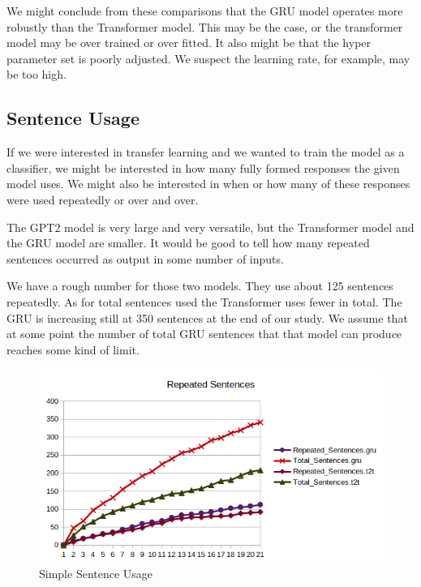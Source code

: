 We might conclude from these comparisons that the GRU model operates more robustly than the Transformer model. This may be the case, or the transformer model may be over trained or over fitted. It also might be that the hyper parameter set is poorly adjusted. We suspect the learning rate, for example, may be too high.

\subsection{Sentence Usage}

If we were interested in transfer learning and we wanted to train the model as a classifier, we might be interested in how many fully formed responses the given model uses. We might also be interested in when or how many of these responses were used repeatedly or over and over.

The GPT2 model is very large and very versatile, but the Transformer model and the GRU model are smaller. It would be good to tell how many repeated sentences occurred as output in some number of inputs.

We have a rough number for those two models. They use about 125 sentences repeatedly. As for total sentences used the Transformer uses fewer in total. The GRU is increasing still at 350 sentences at the end of our study. We assume that at some point the number of total GRU sentences that that model can produce reaches some kind of limit.

\begin{figure}[H]
	\begin{center}
		\includegraphics[scale=0.6]{Figure_8}
		
		
	\end{center}
	\caption[Simple Sentence Usage]{Simple Sentence Usage}
	
	
\end{figure}

